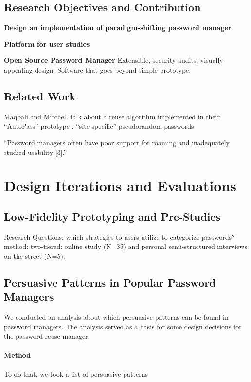 \subsection{Research Objectives and Contribution}
\textbf{Design an implementation of paradigm-shifting password manager}


\textbf{Platform for user studies}

\textbf{Open Source Password Manager}
Extensible, security audits, visually appealing design. Software that goes beyond simple prototype.

\subsection{Related Work}
Maqbali and Mitchell talk about a reuse algorithm implemented in their ``AutoPass'' prototype \cite{Maqbali2016PasswordGenerators}.
``site-specific'' pseudorandom passwords

``Password managers often have poor support for roaming and inadequately studied usability [3].'' \cite{Herley2012PersistenceOfPasswords}

\section{Design Iterations and Evaluations}

\subsection{Low-Fidelity Prototyping and Pre-Studies}
Research Questions: which strategies to users utilize to categorize passwords?
method: two-tiered: online study (N=35) and personal semi-structured interviews on the street (N=5). 


\subsection{Persuasive Patterns in Popular Password Managers}
We conducted an analysis about which persuasive patterns can be found in password managers. The analysis served as a basis for some design decisions for the password reuse manager. 

\paragraph{Method}
To do that, we took a list of persuasive patterns 

